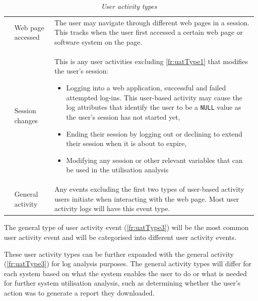 \begin{table}[!htb]
	\centering
	\caption[User activity types]
	{\textit{User activity types}}
	\label{tbl:ch2_userActivityTypes}
	\begin{tabularx}{\textwidth}{llX}
		\toprule
		\thead{Req. ID} & \thead{Activity Type} & \thead{Description} \\
		\midrule

		\rowcolor{lightgray}
		\subsubphase{fr:uatType1} & Web page accessed & The user may navigate through different web pages in a session. This tracks when the user first accessed a certain web page or software system on the page. \\


		\subsubphase{fr:uatType2} & Session changes & This is any user activities excluding \ref{fr:uatType1} that modifies the user's session:
		\begin{itemize}
			\item Logging into a web application, successful and failed attempted log-ins. This user-based activity may cause the log attributes that identify the user to be a \texttt{NULL} value as the user's session has not started yet,
			\item Ending their session by logging out or declining to extend their session when it is about to expire,
			\item Modifying any session or other relevant variables that can be used in the utilisation analysis
		\end{itemize}\\

		\rowcolor{lightgray}
		\subsubphase{fr:uatType3} & General activity & Any events excluding the first two types of user-based activity users initiate when interacting with the web page. Most user activity logs will
		have this event type.\\ 
		\bottomrule
	\end{tabularx}
\end{table}

\clearpage

The general type of user activity event (\ref{fr:uatType3}) will be the most common user activity event and will be categorised into different user activity events. \par These user activity types can be further expanded with the general activity (\ref{fr:uatType3}) for log analysis purposes. The general activity types will differ for each system based on what the system enables the user to do or what is needed for further system utilisation analysis, such as determining whether the user's action was to generate a report they downloaded.

